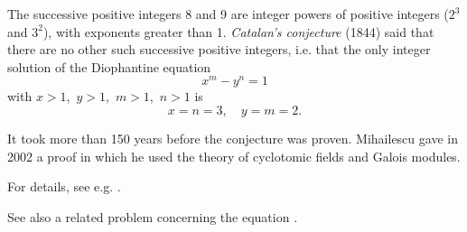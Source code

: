 \documentclass[12pt]{article}
\theoremstyle{definition}
\begin{document}
The successive positive integers 8 and 9 are integer powers of positive integers ($2^3$ and $3^2$), with exponents greater than 1. {\em Catalan's conjecture} (1844) said that there are no other such successive positive integers, i.e. that the only integer solution of the Diophantine equation
$$x^m-y^n = 1$$
with\; $x > 1$,\, $y > 1$,\, $m > 1$,\, $n > 1$\; is
$$x = n = 3, \quad y = m = 2.$$

It took more than 150 years before the conjecture was proven.  Mihailescu gave in 2002 a proof in which he used the theory of cyclotomic fields and Galois modules.

For details, see e.g. 
.

See also a related problem concerning the equation 
.
\end{document}
